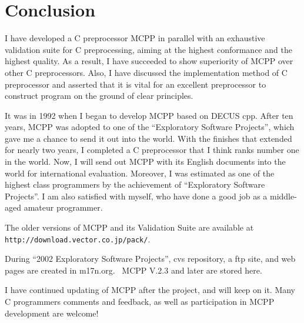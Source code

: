 \documentclass[twocolumn]{article}
\begin{document}
\section{Conclusion}

I have developed a C preprocessor MCPP in parallel with an exhaustive validation suite for C preprocessing, aiming at the highest conformance and the highest quality.  As a result, I have succeeded to show superiority of MCPP over other C preprocessors.  Also, I have discussed the implementation method of C preprocessor and asserted that it is vital for an excellent preprocessor to construct program on the ground of clear principles.

It was in 1992 when I began to develop MCPP based on DECUS cpp.  After ten years, MCPP was adopted to one of the ``Exploratory Software Projects'', which gave me a chance to send it out into the world.  With the finishes that extended for nearly two years, I completed a C preprocessor that I think ranks number one in the world.  Now, I will send out MCPP with its English documents into the world for international evaluation.  Moreover, I was estimated as one of the highest class programmers by the achievement of ``Exploratory Software Projects''.  I am also satisfied with myself, who have done a good job as a middle-aged amateur programmer.

\vspace{8pt}

The older versions of MCPP and its Validation Suite are available at \verb|http://download.vector.co.jp/pack/|.

During ``2002 Exploratory Software Projects'', cvs repository, a ftp site, and web pages are created in m17n.org.~\cite{mcpp}  MCPP V.2.3 and later are stored here.

I have continued updating of MCPP after the project, and will keep on it.  Many C programmers comments and feedback, as well as participation in MCPP development are welcome!
\end{document}
